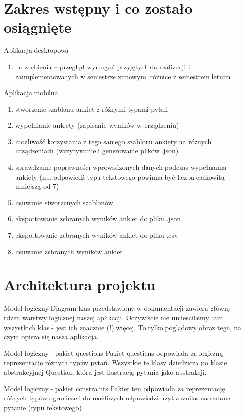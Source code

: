 \documentclass[a4paper,10pt]{beamer}
\begin{document}
		\section{Zakres wstępny i co zostało osiągnięte}
		
	
		\begin{frame}{Aplikacja desktopowa}
			
			\begin{enumerate}
				\item do zrobienia – przegląd wymagań przyjętych do realizacji i zaimplementowanych w semestrze zimowym, różnice z semestrem letnim
			\end{enumerate}
		\end{frame}
	
		\begin{frame}{Aplikacja mobilna}
			\begin{enumerate}
				\item	stworzenie szablonu ankiet z różnymi typami pytań 
				\item	wypełnianie ankiety (zapisanie wyników w urządzeniu)
				\item	możliwość korzystania z tego samego szablonu ankiety na różnych urządzeniach (wczytywanie i generowanie plików .json)
				\item	sprawdzanie poprawności wprowadzonych danych podczas wypełniania ankiety (np. odpowiedź typu tekstowego powinna być liczbą całkowitą mniejszą od 7) 
				\item	usuwanie stworzonych szablonów
				\item	eksportowanie zebranych wyników ankiet do pliku .json
				\item	eksportowanie zebranych wyników ankiet do pliku .csv
				\item	usuwanie zebranych wyników ankiet		
			\end{enumerate}
		\end{frame}
	
	
		\section{Architektura projektu}
		
		
		\begin{frame}{Model logiczny}
			Diagram klas przedstawiony w dokumentacji zawiera główny rdzeń warstwy logicznej naszej aplikacji. Oczywiście nie umieściliśmy tam wszystkich klas - jest ich znacznie (!) więcej. To tylko poglądowy obraz tego, na czym opiera się nasza aplikacja.
		\end{frame}
		\begin{frame}{Model logiczny - pakiet questions}
			Pakiet questions odpowiada za logiczną reprezentację różnych typów pytań. 	Wszystkie te klasy dziedziczą po klasie abstrakcyjnej Question, która jest ilustracją pytania jako abstrakcji.
	\end{frame}
	\begin{frame}{Model logiczny - pakiet constraints}
		Pakiet ten odpowiada za reprezentację różnych typów ograniczeń do możliwych odpowiedzi użytkownika na zadane pytanie (typu tekstowego).
	
		\end{frame}
		
\end{document}
